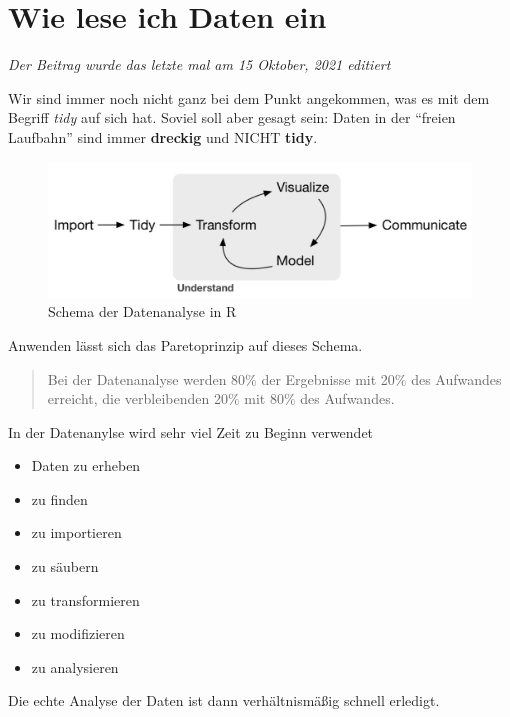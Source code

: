 \documentclass[
]{article}
\providecommand{\tightlist}{%
  \setlength{\itemsep}{0pt}\setlength{\parskip}{0pt}}
\begin{document}
\hypertarget{wie-lese-ich-daten-ein}{%
\section{Wie lese ich Daten ein}\label{wie-lese-ich-daten-ein}}

\emph{Der Beitrag wurde das letzte mal am 15 Oktober, 2021 editiert}

Wir sind immer noch nicht ganz bei dem Punkt angekommen, was es mit dem Begriff \emph{tidy} auf sich hat. Soviel soll aber gesagt sein: Daten in der ``freien Laufbahn'' sind immer \textbf{dreckig} und NICHT \textbf{tidy}.

\begin{figure}

{\centering \includegraphics[width=1\linewidth]{images/001} 

}

\caption{Schema der Datenanalyse in R}\label{fig:unnamed-chunk-105}
\end{figure}

Anwenden lässt sich das Paretoprinzip auf dieses Schema.

\begin{quote}
Bei der Datenanalyse werden 80\% der Ergebnisse mit 20\% des Aufwandes erreicht, die verbleibenden 20\% mit 80\% des Aufwandes.
\end{quote}

In der Datenanylse wird sehr viel Zeit zu Beginn verwendet

\begin{itemize}
\tightlist
\item
  Daten zu erheben
\item
  zu finden
\item
  zu importieren
\item
  zu säubern
\item
  zu transformieren
\item
  zu modifizieren
\item
  zu analysieren
\end{itemize}

Die echte Analyse der Daten ist dann verhältnismäßig schnell erledigt.
\end{document}
